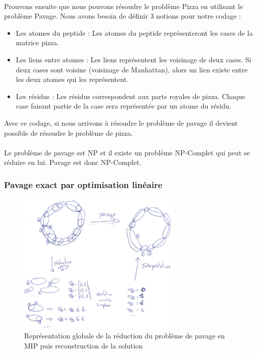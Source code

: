 \documentclass[12pt,french,twoside]{report}
\begin{document}
\paragraph{}Prouvons ensuite que nous pouvons résoudre le problème Pizza en utilisant le problème Pavage.
Nous avons besoin de définir 3 notions pour notre codage :
\begin{itemize}
	\item Les atomes du peptide : Les atomes du peptide représenteront les cases de la matrice pizza.
	\item Les liens entre atomes : Les liens représentent les voisinage de deux cases.
Si deux cases sont voisine (voisinage de Manhattan), alors un lien existe entre les deux atomes qui les représentent.
	\item Les résidus : Les résidus correspondent aux parts royales de pizza.
Chaque case faisant partie de la case sera représentée par un atome du résidu.
\end{itemize}

Avec ce codage, si nous arrivons à résoudre le problème de pavage il devient possible de résoudre le problème de pizza.

\paragraph{}Le problème de pavage est NP et il existe un problème NP-Complet qui peut se réduire en lui.
Pavage est donc NP-Complet.




\subsubsection{Pavage exact par optimisation linéaire}

\label{MIP_p}

\begin{figure}
  \includegraphics[width=300px]{Figures/s2m/pavage/reduction.pdf}
  \caption{\label{reduction}Représentation globale de la réduction du problème de pavage en MIP puis reconstruction de la
  solution}
\end{figure}
\end{document}
